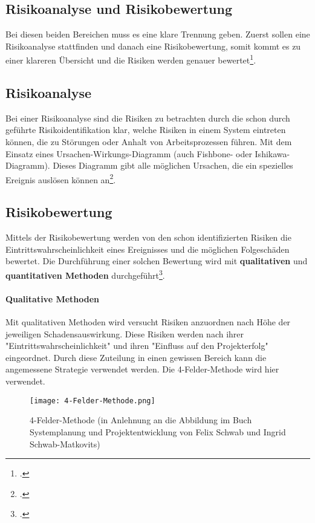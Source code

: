 \subsection{Risikoanalyse und Risikobewertung}
Bei diesen beiden Bereichen muss es eine klare Trennung geben. Zuerst sollen eine Risikoanalyse stattfinden und danach eine Risikobewertung, somit kommt es zu einer klareren Übersicht und die Risiken werden genauer bewertet\footcite{risikoanalyse}.

\subsection{Risikoanalyse}
Bei einer Risikoanalyse sind die Risiken zu betrachten durch die schon durch geführte Risikoidentifikation klar, welche Risiken in einem System eintreten können, die zu Störungen oder Anhalt von Arbeitsprozessen führen. Mit dem Einsatz eines Ursachen-Wirkungs-Diagramm (auch Fishbone- oder Ishikawa-Diagramm). Dieses Diagramm gibt alle möglichen Ursachen, die ein spezielles Ereignis auslösen können an\footcite{risikomanagement-diplomarbeit}.

\subsection{Risikobewertung}
Mittels der Risikobewertung werden von den schon identifizierten Risiken die Eintrittswahrscheinlichkeit eines Ereignisses und die möglichen Folgeschäden bewertet. Die Durchführung einer solchen Bewertung wird mit \textbf{qualitativen} und \textbf{quantitativen Methoden} durchgeführt\footcite{risikomanagement-diplomarbeit}.

\paragraph{Qualitative Methoden}
Mit qualitativen Methoden wird versucht Risiken anzuordnen nach Höhe der jeweiligen Schadensauswirkung.
Diese Risiken werden nach ihrer "Eintrittswahrscheinlichkeit" und ihren "Einfluss auf den Projekterfolg" eingeordnet. Durch diese Zuteilung in einen gewissen Bereich kann die angemessene Strategie verwendet werden. Die 4-Felder-Methode wird hier verwendet.

\begin{center}
\begin{figure}[H]
    \centering
    \texttt{[image: 4-Felder-Methode.png]}
    \caption{4-Felder-Methode (in Anlehnung an die Abbildung im Buch Systemplanung und Projektentwicklung von Felix Schwab und Ingrid Schwab-Matkovits)}
\end{figure}
\end{center}

